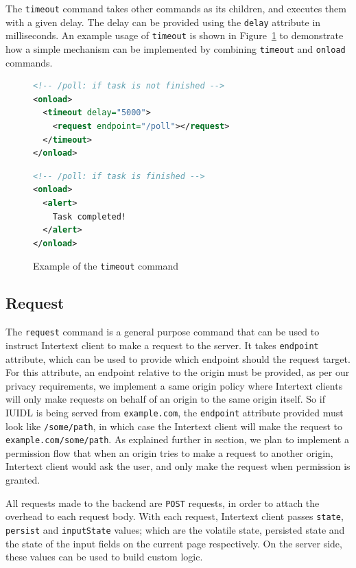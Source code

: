 The \texttt{timeout} command takes other commands as its children, and executes them with a given delay. The delay can be provided using the \texttt{delay} attribute in milliseconds. An example usage of \texttt{timeout} is shown in Figure~\ref{fig:timeout_usage} to demonstrate how a simple  mechanism can be implemented by combining \texttt{timeout} and \texttt{onload} commands.

\begin{figure}[htb]
\begin{minipage}{\linewidth}
\begin{lstlisting}[language=xml]
<!-- /poll: if task is not finished -->
<onload>
  <timeout delay="5000">
    <request endpoint="/poll"></request>
  </timeout>
</onload>
\end{lstlisting}
\begin{lstlisting}[language=xml]
<!-- /poll: if task is finished -->
<onload>
  <alert>
    Task completed!
  </alert>
</onload>
\end{lstlisting}
\end{minipage}
\caption{Example of the \texttt{timeout} command}%
\label{fig:timeout_usage}%
\end{figure}

\subsection{Request}

The \texttt{request} command is a general purpose command that can be used to instruct Intertext client to make a request to the server. It takes \texttt{endpoint} attribute, which can be used to provide which endpoint should the request target. For this attribute, an endpoint relative to the origin must be provided, as per our privacy requirements, we implement a same origin policy where Intertext clients will only make requests on behalf of an origin to the same origin itself. So if IUIDL is being served from \texttt{example.com}, the \texttt{endpoint} attribute provided must look like \texttt{/some/path}, in which case the Intertext client will make the request to \texttt{example.com/some/path}. As explained further in  section, we plan to implement a permission flow that when an origin tries to make a request to another origin, Intertext client would ask the user, and only make the request when permission is granted.

All requests made to the backend are \texttt{POST} requests, in order to attach the overhead to each request body. With each request, Intertext client passes \texttt{state}, \texttt{persist} and \texttt{inputState} values; which are the volatile state, persisted state and the state of the input fields on the current page respectively. On the server side, these values can be used to build custom logic.

